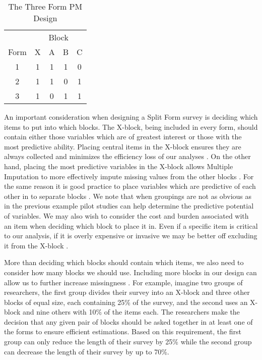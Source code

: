 \documentclass{svjour3}                     %
\begin{document}
\begin{table}[h!]
	\centering
	\caption{The Three Form PM Design}
	\label{tab:table10}
	\setlength{\tabcolsep}{1cm}
	\begin{tabular}{c|cccc}
		\toprule
		& \multicolumn{4}{c}{Block} \\
		Form & X & A & B & C \\
		\midrule
		1 & 1 & 1 & 1 & 0 \\
		2 & 1 & 1 & 0 & 1 \\
		3 & 1 & 0 & 1 & 1 \\
		\bottomrule
	\end{tabular}
\end{table}

An important consideration when designing a Split Form survey is deciding which items to put into which blocks. The X-block, being included in every form, should contain either those variables which are of greatest interest or those with the most predictive ability.
Placing central items in the X-block ensures they are always collected and minimizes the efficiency loss of our analyses \citep{thomas2006evaluation}. On the other hand, placing the most predictive variables in the X-block allows Multiple Imputation to more effectively impute missing values from the other blocks \citep{gottschall2012comparison}. For the same reason it is good practice to place variables which are predictive of each other in to separate blocks \citep{gottschall2012comparison}. We note that when groupings are not as obvious as in the previous example pilot studies can help determine the predictive potential of variables. We may also wish to consider the cost and burden associated with an item when deciding which block to place it in. Even if a specific item is critical to our analysis, if it is overly expensive or invasive we may be better off excluding it from the X-block \citep{little2013planned}. \par


More than deciding which blocks should contain which items, we also need to consider how many blocks we should use. Including more blocks in our design can allow us to further increase missingness \citep{graham2006planned}. For example, imagine two groups of researchers, the first group divides their survey into an X-block and three other blocks of equal size, each containing 25\% of the survey, and the second uses an X-block and nine others with 10\% of the items each. The researchers make the decision that any given pair of blocks should be asked together in at least one of the forms to ensure efficient estimations. Based on this requirement, the first group can only reduce the length of their survey by 25\% while the second group can decrease the length of their survey by up to 70\%. \par
\end{document}
